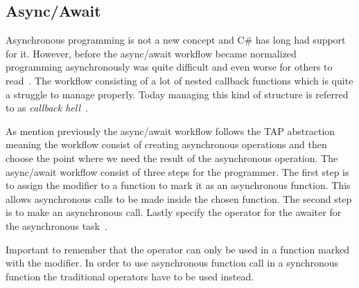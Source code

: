 \subsection{Async/Await}
Asynchronous programming is not a new concept and C\# has long had support for it. However, before the async/await workflow became normalized programming asynchronously was quite difficult and even worse for others to read~\cite{DOC:TaskAsyncProgModel}. The workflow consisting of a lot of nested callback functions which is quite a struggle to manage properly. Today managing this kind of structure is referred to as \emph{callback hell}~\cites[p.~1-2]{PAPER:Callbackhell}[p~.2]{PAPER:PaxosCleipnir}. 

As mention previously the async/await workflow follows the TAP abstraction~\cite{DOC:TaskAsyncProgModel} meaning the workflow consist of creating asynchronous operations and then choose the point where we need the result of the asynchronous operation. The async/await workflow consist of three steps for the programmer. The first step is to assign the  modifier to a function to mark it as an asynchronous function. This allows asynchronous calls to be made inside the chosen function. The second step is to make an asynchronous call. Lastly specify the  operator for the awaiter for the asynchronous task~\cite{WEB:AsyncAwaitTut, DOC:AsyncAwait, VIDEO:AsyncConBack}.
 
Important to remember that the  operator can only be used in a function marked with the  modifier. In order to use asynchronous function call in a synchronous function the traditional operators have to be used instead\cite{DOC:AsyncAwait, DOC:TaskAsyncProgModel}. 

